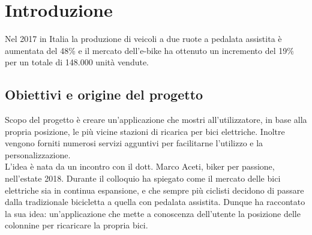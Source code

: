
%

\chapter{Introduzione}
	Nel 2017 in Italia la produzione di veicoli a due ruote a pedalata assistita è aumentata
	del 48\% e il mercato dell'e-bike ha ottenuto un incremento del 
	19\%  per un totale di 148.000 unità vendute.
	\cite{biciElettrica}   
	\section{Obiettivi e origine del progetto}
	Scopo del progetto è creare un’applicazione che mostri all’utilizzatore, in
	base  alla propria posizione, le più vicine stazioni di ricarica per bici
	elettriche. Inoltre vengono forniti numerosi servizi agguntivi per
	facilitarne l'utilizzo e la personalizzazione.\\
	L'idea è nata da un incontro con il dott. Marco Aceti, biker per passione,
	nell'estate 2018. Durante il colloquio ha spiegato come il mercato delle
	bici elettriche sia in continua espansione, e che sempre più ciclisti
	decidono di passare dalla tradizionale bicicletta a quella con pedalata
	assistita. Dunque ha raccontato la sua idea: un'applicazione che mette a
	conoscenza dell'utente la posizione delle colonnine per ricaricare la
	propria bici.
	
